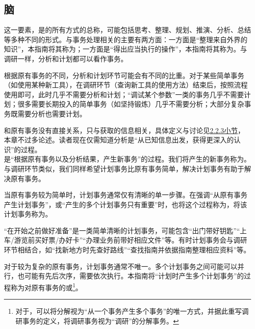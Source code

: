 \subsection{脑}
这一要素，是的所有方式的总称，可能包括思考、整理、规划、推演、分析、总结等多种不同的形式。与事务处理相关的主要有两方面：一方面是“整理来自外界的知识”，本指南将其称为；一方面是“得出应当执行的操作”，本指南将其称为。与调研一样，分析和计划都可以看作事务。
\begin{examples}
    根据原有事务的不同，分析和计划环节可能会有不同的比重。对于某些简单事务（如使用某种新工具），在调研环节（查询新工具的使用方法）结束后，按照流程使用即可，此时几乎不需要分析和计划；“调试某个参数”一类的事务几乎不需要计划；很多需要长期投入的简单事务（如坚持锻炼）几乎不需要分析；大部分复杂事务既需要分析也需要计划。
\end{examples}
和原有事务没有直接关系，只与获取的信息相关，具体定义与讨论见\hyperref[def:分析]{2.2.3小节}，本章不过多论述。读者现在仅需知道分析是“从已知信息出发，获得更深入的认识”的过程。\\
是“根据原有事务以及分析结果，产生新事务”的过程。我们将产生的新事务称为。与调研环节类似，我们同样希望计划事务比原有事务简单，解决计划事务有助于解决原有事务。

当原有事务较为简单时，计划事务通常仅有清晰的单一步骤。在强调“从原有事务产生计划事务”，或“产生的多个计划事务只有重要”时，也将这个过程称为，将该计划事务称为。
\begin{examples}
“在开始之前做好准备”是一类简单清晰的计划事务，可能包含“出门带好钥匙”“上车/游览前买好票/办好卡”“办理业务前带好相应文件”等。有时计划事务会与调研环节相结合，如“找新地方时先查好路线”“查找指南并依据指南整理相应资料”等。

\end{examples}
对于较为复杂的原有事务，计划事务通常不唯一。多个计划事务之间可能可以并行，也可能有先后次序，需要依次执行。本指南将“计划时产生多个计划事务”的过程称为对原有事务的或\footnote{对于\rigorous，可以将分解视为“从一个事务产生多个事务”的唯一方式，并据此重写调研事务的定义，将调研事务视为“调研”的分解事务。}。

